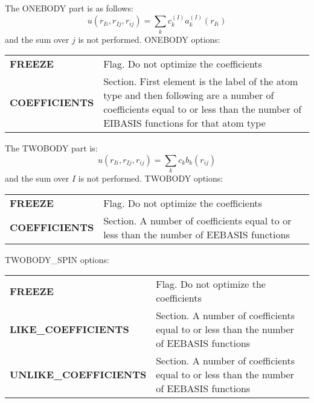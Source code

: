 \documentclass[12pt]{article}
\begin{document}
The ONEBODY part is as follows: 
\begin{equation}
 u(r_{Ii},r_{Ij},r_{ij})=\sum_k c_{k}^{(I)} a_k^{(I)}(r_{Ii})
\end{equation}
and the sum over $j$ is not performed.
ONEBODY options: \\
\begin{tabular}{lp{12cm}}
{\bf FREEZE} & Flag. Do not optimize the coefficients \\
{\bf COEFFICIENTS } & Section.  First element is the label of the atom type and then following are a number of coefficients equal to or less than the number of EIBASIS functions for that atom type \\
\end{tabular}

The TWOBODY part is:
\begin{equation}
 u(r_{Ii},r_{Ij},r_{ij})=\sum_k c_{k} b_k(r_{ij})
\end{equation}
and the sum over $I$ is not performed.
TWOBODY options: \\
\begin{tabular}{lp{12cm}}
{\bf FREEZE} & Flag. Do not optimize the coefficients \\
{\bf COEFFICIENTS } & Section.  A number of coefficients equal to or less than the number of EEBASIS functions  \\
\end{tabular}

TWOBODY\_SPIN options: \\
\begin{tabular}{lp{12cm}}
{\bf FREEZE} & Flag. Do not optimize the coefficients \\
{\bf LIKE\_COEFFICIENTS } & Section.  A number of coefficients equal to or less than the number of EEBASIS functions  \\
{\bf UNLIKE\_COEFFICIENTS } & Section.  A number of coefficients equal to or less than the number of EEBASIS functions  \\
\end{tabular}
\end{document}
